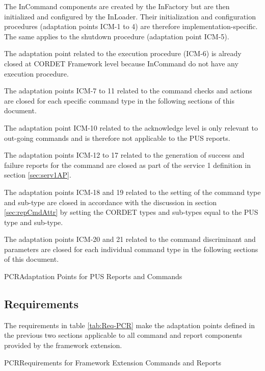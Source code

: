 \documentclass[a4paper,10pt]{article}
\newenvironment{fw_itemize}						%
{\begin{itemize}
  \setlength{\itemsep}{1mm}
  \setlength{\parskip}{0pt}
  \setlength{\parsep}{0pt}}
{\end{itemize}}
\newenvironment{cr_req}[2]
{
\begin{longtable}{|l|p{11.8cm}|}
\caption{#2}\label{tab:Req-#1} \\
\hline
\rowcolor{light-gray}
\textbf{Req. ID} & \textbf{Requirement Text}\\
\hline\hline
\endfirsthead
\rowcolor{light-gray}
\textbf{Req. ID} & \textbf{Requirement Text}\\
\hline\hline
\endhead
\DTLforeach*[\DTLiseq{\cat}{#1}]{dbReq}{\cat=Category,\type=Type,\id=Id,\reqText=Text}
{\DTLiffirstrow{}{\\\hline}P-\cat-\id/\type & \textit{\reqText}}\\\hline
}
{\end{longtable}}
\newenvironment{cr_ap}[2]
{
\begin{longtable}{|l|p{4.7cm}|p{6.9cm}|}
\caption{#2}\label{tab:AP-#1} \\
\hline
\rowcolor{light-gray}
\textbf{AP ID} & \textbf{Adaptation Point} & \textbf{Default Value}\\
\hline\hline
\endfirsthead
\rowcolor{light-gray}
\textbf{AP ID} & \textbf{Adaptation Point} & \textbf{Default Value}\\
\hline\hline
\endhead
\DTLforeach*[\DTLiseq{\cat}{#1}]{dbAP}{\cat=Category,\origin=Origin,\id=Id,\ap=AP,\defValue=DefValue}
{\DTLiffirstrow{}{\\\hline}P-\cat-\id & \ap (\origin) & \defValue}\\\hline
}
{\end{longtable}}
\begin{document}
\begin{fw_itemize}
\item The InCommand components are created by the InFactory but are then initialized and configured by the InLoader. Their initialization and configuration procedures (adaptation points ICM-1 to 4) are therefore implementation-specific. The same applies to the shutdown procedure (adaptation point ICM-5).
\item The adaptation point related to the execution procedure (ICM-6) is already closed at CORDET Framework level because InCommand do not have any execution procedure.
\item The adaptation points ICM-7 to 11 related to the command checks and actions are closed for each specific command type in the following sections of this document.
\item The adaptation point ICM-10 related to the acknowledge level is only relevant to out-going commands and is therefore not applicable to the PUS reports.
\item The adaptation points ICM-12 to 17 related to the generation of success and failure reports for the command are closed as part of the service 1 definition in section \ref{sec:serv1AP}.
\item The adaptation points ICM-18 and 19 related to the setting of the command type and sub-type are closed in accordance with the discussion in section \ref{sec:repCmdAttr} by setting the CORDET types and sub-types equal to the PUS type and sub-type.
\item The adaptation points ICM-20 and 21 related to the command discriminant and parameters are closed for each individual command type in the following sections of this document.
\end{fw_itemize}

\begin{cr_ap}{PCR}{Adaptation Points for PUS Reports and Commands}
\end{cr_ap}

\subsection{Requirements}\label{sec:repCmdReq}
The requirements in table \ref{tab:Req-PCR} make the adaptation points defined in the previous two sections applicable to all command and report components provided by the framework extension.

\begin{cr_req}{PCR}{Requirements for Framework Extension Commands and Reports}
\end{cr_req}
\end{document}
